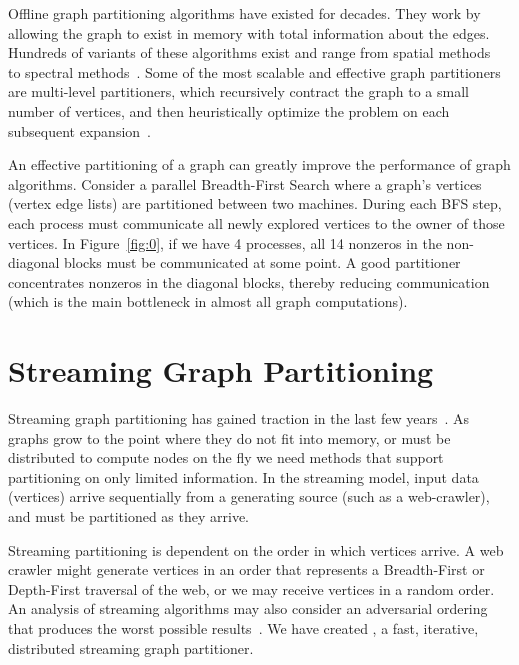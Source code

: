
Offline graph partitioning algorithms have existed for decades.
They work by allowing the graph to exist in memory with total information about the edges.
Hundreds of variants of these algorithms exist and range from spatial methods~\cite{Gilbert95geometricmesh} to spectral methods~\cite{arora2009expander}.
Some of the most scalable and effective graph partitioners are multi-level partitioners, which recursively contract the graph to a small number of vertices, and then heuristically optimize the problem on each subsequent expansion~\cite{karypis1998multilevel}. 

An effective partitioning of a graph can greatly improve the performance of graph algorithms.
Consider a parallel Breadth-First Search where a graph's vertices (vertex edge lists) are partitioned between two machines.
During each BFS step, each process must communicate all newly explored vertices to the owner of those vertices.
In Figure~\ref{fig:0}, if we have 4 processes, all 14 nonzeros in the non-diagonal blocks must be communicated at some point.
A good partitioner concentrates nonzeros in the diagonal blocks, thereby reducing communication (which is the main bottleneck in almost all graph computations). 

\section{Streaming Graph Partitioning}
Streaming graph partitioning has gained traction in the last few years~\cite{DBLP:journals/corr/abs-1212-1121,Stanton:2012:SGP:2339530.2339722,tsourakakis2012fennel}.
As graphs grow to the point where they do not fit into memory, or must be distributed to compute nodes on the fly we need methods that support partitioning on only limited information.
In the streaming model, input data (vertices) arrive sequentially from a generating source (such as a web-crawler), and must be partitioned as they arrive.

Streaming partitioning is dependent on the order in which vertices arrive.
A web crawler might generate vertices in an order that represents a Breadth-First or Depth-First traversal of the web, or we may receive vertices in a random order.
An analysis of streaming algorithms may also consider an adversarial ordering that produces the worst possible results~\cite{Stanton:2012:SGP:2339530.2339722}.
We have created \ourmethod, a fast, iterative, distributed streaming graph partitioner. 


